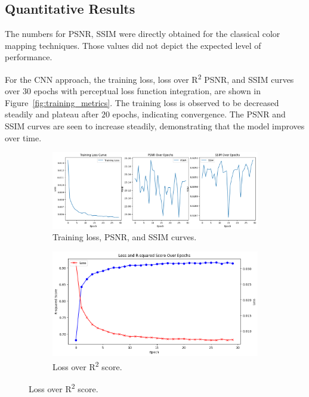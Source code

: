 \documentclass[conference]{IEEEtran}
\begin{document}
\subsection{Quantitative Results}
The numbers for PSNR, SSIM were directly obtained for the classical color mapping techniques. Those values did not depict the expected level of performance.

For the CNN approach, the training loss, loss over R\textsuperscript{2} PSNR, and SSIM curves over $30$ epochs with perceptual loss function integration, are shown in Figure~\ref{fig:training_metrics}. The training loss is observed to be decreased steadily and plateau after $20$ epochs, indicating convergence. The PSNR and SSIM curves are seen to increase steadily, demonstrating that the model improves over time.

\begin{figure}[t]
    \centering
    \begin{subfigure}{\columnwidth}
        \centering
        \includegraphics[width=\linewidth]{6_loss_psnr_ssim.png}
        \caption{Training loss, PSNR, and SSIM curves.}
        \label{fig:curves}
    \end{subfigure}
    \hfill
    \begin{subfigure}{\columnwidth}
        \centering
        \includegraphics[width=\linewidth]{7_loss_over_Rsquard_score.png}
        \caption{Loss over R\textsuperscript{2} score.}

\end{subfigure}
\end{figure}
\end{document}
